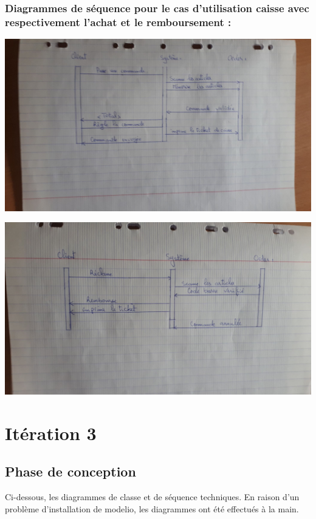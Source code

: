 \documentclass[french,10pt,a4paper]{report}
\begin{document}
\subsubsection{Diagrammes de séquence pour le cas d’utilisation caisse avec respectivement l’achat et le remboursement :}
\begin{center}
 \includegraphics[scale=0.17]{captures/g_it2_3.jpg}
\end{center}
\begin{center}
 \includegraphics[scale=0.17]{captures/g_it2_4.jpg}
\end{center}

\section{\textcolor{rr}{Itération 3}}

\subsection{\textcolor{bb}{Phase de conception }}

Ci-dessous, les diagrammes de classe et de séquence techniques. En raison d’un problème d’installation de modelio, les diagrammes ont été effectués à la main.
\end{document}
